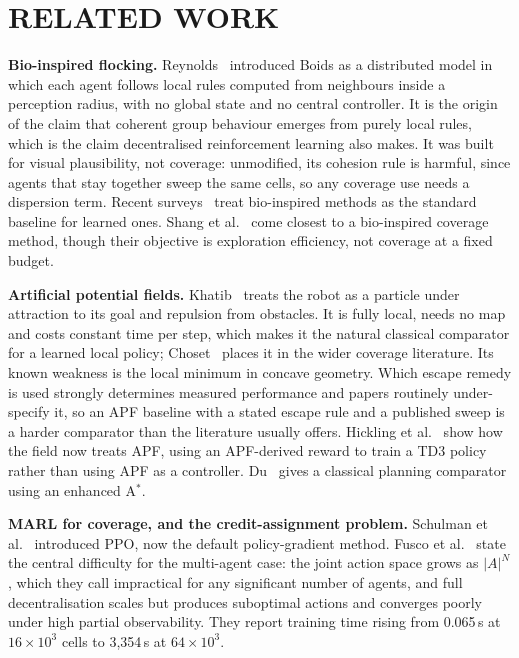 \documentclass[a4paper, 10pt, conference]{ieeeconf}
\begin{document}
\section{RELATED WORK}\label{sec:related}

\textbf{Bio-inspired flocking.} Reynolds~\cite{reynolds1987}
introduced Boids as a distributed model in which each agent follows
local rules computed from neighbours inside a perception radius, with
no global state and no central controller. It is the origin of the
claim that coherent group behaviour emerges from purely local rules,
which is the claim decentralised reinforcement learning also makes. It
was built for visual plausibility, not coverage: unmodified, its
cohesion rule is harmful, since agents that stay together sweep the
same cells, so any coverage use needs a dispersion term. Recent
surveys~\cite{xu2022,alqudsi2024,arshid2025} treat bio-inspired
methods as the standard baseline for learned ones.
Shang et al.~\cite{shang2025} come closest to a bio-inspired coverage
method, though their objective is exploration efficiency, not coverage
at a fixed budget.

\textbf{Artificial potential fields.} Khatib~\cite{khatib1986} treats
the robot as a particle under attraction to its goal and repulsion
from obstacles. It is fully local, needs no map and costs constant
time per step, which makes it the natural classical comparator for a
learned local policy; Choset~\cite{choset2001} places it in the wider
coverage literature. Its known weakness is the local minimum in
concave geometry. Which escape remedy is used strongly determines
measured performance and papers routinely under-specify it, so an APF
baseline with a stated escape rule and a published sweep is a harder
comparator than the literature usually offers. Hickling et al.~\cite{hickling2025} show how the
field now treats APF, using an APF-derived reward to train a TD3
policy rather than using APF as a controller. Du~\cite{du2023} gives a
classical planning comparator using an enhanced A$^*$.

\textbf{MARL for coverage, and the credit-assignment problem.}
Schulman et al.~\cite{schulman2017} introduced PPO, now the default
policy-gradient method. Fusco et al.~\cite{fusco2025} state the
central difficulty for the multi-agent case: the joint action space
grows as $|A|^N$, which they call impractical for any significant
number of agents, and full decentralisation scales but produces
suboptimal actions and converges poorly under high partial
observability. They report training time rising from 0.065\,s at
$16\times10^3$ cells to 3{,}354\,s at $64\times10^3$.
\end{document}
